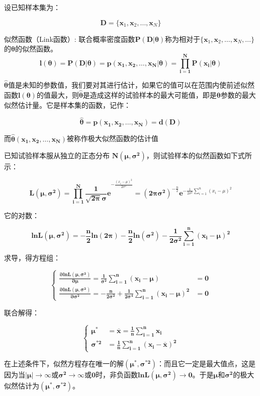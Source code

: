 \documentclass[a4paper,AutoFakeBold,oneside,12pt]{book}
\begin{document}
	设已知样本集为：

	$$\bm{D}=\{\bm{x}_1,\bm{x}_2,\ldots,\bm{x}_N\}$$

	似然函数（Link函数）: 联合概率密度函数$\bm{P(D|\theta)}$称为相对于$\{\bm{x}_1,\bm{x}_2,\ldots,\bm{x}_N,\ldots\}$的$\bm{\theta}$的似然函数。
	$$\bm{l(\theta)}=\bm{P(D|\theta)}=\bm{p({x}_1,{x}_2,\ldots,{x}_N|\theta)}=\bm{\prod_{i=1}^N P(x_i|\theta)}$$

	$\bm{\hat{\theta}}$值是未知的参数值，我们要对其进行估计，如果它的值可以在范围内使前述似然函数$\bm{l(\theta)}$的值最大，则$\bm{\hat{\theta}}$是造成这样的试验样本的最大可能值，即是$\bm{\theta}$参数的最大似然估计量。它是样本集的函数，记作：

	$$\bm{\hat{\theta}}=\bm{p({x}_1,{x}_2,\ldots,{x}_N)}=\bm{d(D)}$$

	而$\bm{\hat{\theta}({x}_1,{x}_2,\ldots,{x}_N)}$被称作极大似然函数的估计值

	已知试验样本服从独立的正态分布 $\bm{N(\mu,\sigma^2)}$，则试验样本的似然函数如下式所示：

	$$\bm{L(\mu,\sigma^2)}=\bm{\prod_{i=1}^N\frac{1}{\sqrt{2\pi}\sigma}e}^{-\frac{({x}_i-\mu)^2}{2\sigma^2}}=\bm{(2\pi\sigma^2)}^{-\frac{n}{2}}\bm{e}^{-\frac{1}{2\sigma^2}\sum_{i=1}^n ({x}_i-\mu)^2}$$

	它的对数：

	$$\bm{lnL(\mu,\sigma^2)}=\bm{-\frac{n}{2}ln(2\pi)}-\bm{\frac{n}{2}ln(\sigma^2)}-\bm{\frac{1}{2\sigma^2}\sum_{i=1}^n ({x}_i-\mu)^2}$$

	求导，得方程组：
	
	$$
	\begin{cases} 
	\bm{\frac{\partial lnL(\mu,\sigma^2)}{\partial \mu}}=\bm{\frac{1}{\sigma^2}\sum_{i=1}^n ({x}_i-\mu)}&=\bm{0} \\
	\bm{\frac{\partial lnL(\mu,\sigma^2)}{\partial \sigma^2}}=\bm{-\frac{n}{2\sigma^2}}+\bm{\frac{1}{2\sigma^4}\sum_{i=1}^n ({x}_i-\mu)^2}&=\bm{0}
	 \end{cases}	
	$$

	联合解得：

	$$
	\begin{cases} 
	\bm{\mu^*}&=\bm{\overline{x}}=\bm{\frac{1}{n}\sum_{i=1}^n {x}_i} \\
	\bm{\sigma^{*2}}&=\bm{\frac{1}{n}\sum_{i=1}^n ({x}_i-\overline{x})^2}
	 \end{cases}	
	$$

	在上述条件下，似然方程存在唯一的解$\bm{(\mu^*,\sigma^{*2})}$：而且它一定是最大值点，这是因为当$\bm{|\mu|}\to\bm{\infty}$或$\bm{\sigma^2}\to\bm{\infty}$或$\bm{0}$时，非负函数$\bm{lnL(\mu,\sigma^2)}\to\bm{0}$。于是$\bm{\mu}$和$\bm{\sigma^{2}}$的极大似然估计为$\bm{(\mu^*,\sigma^{*2})}$。
\end{document}
